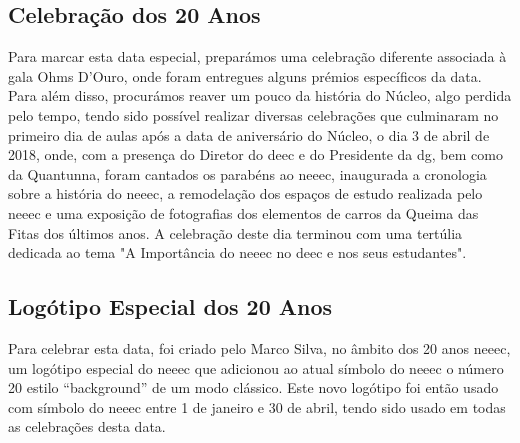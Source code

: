 
\subsection{Celebração dos 20 Anos}

Para marcar esta data especial, preparámos uma celebração diferente associada à gala Ohms D'Ouro, onde foram entregues alguns prémios específicos da data. Para além disso, procurámos reaver um pouco da história do Núcleo, algo perdida pelo tempo, tendo sido possível realizar diversas celebrações que culminaram no primeiro dia de aulas após a data de aniversário do Núcleo, o dia 3 de abril de 2018, onde, com a presença do Diretor do \acrshort{deec} e do Presidente da \acrshort{dg}, bem como da Quantunna, foram cantados os parabéns ao \acrshort{neeec}, inaugurada a cronologia sobre a história do \acrshort{neeec}, a remodelação dos espaços de estudo realizada pelo \acrshort{neeec} e uma exposição de fotografias dos elementos de carros da Queima das Fitas dos últimos anos. A celebração deste dia terminou com uma tertúlia dedicada ao tema "A Importância do \acrshort{neeec} no \acrshort{deec} e nos seus estudantes".

\subsection{Logótipo Especial dos 20 Anos}

Para celebrar esta data, foi criado pelo Marco Silva, no âmbito dos 20 anos \acrshort{neeec}, um logótipo especial do \acrshort{neeec} que adicionou ao atual símbolo do \acrshort{neeec} o número 20 estilo “background” de um modo clássico. Este novo logótipo foi então usado com símbolo do \acrshort{neeec} entre 1 de janeiro e 30 de abril, tendo sido usado em todas as celebrações desta data.